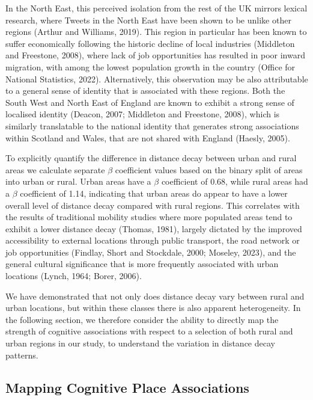 \documentclass[
  letterpaper,
  11pt,
  english,
  onehalfspacing,
  headsepline]{MastersDoctoralThesis}
\begin{document}
In the North East, this perceived isolation from the rest of the UK
mirrors lexical research, where Tweets in the North East have been shown
to be unlike other regions (Arthur and Williams, 2019). This region in
particular has been known to suffer economically following the historic
decline of local industries (Middleton and Freestone, 2008), where lack
of job opportunities has resulted in poor inward migration, with among
the lowest population growth in the country (Office for National
Statistics, 2022). Alternatively, this observation may be also
attributable to a general sense of identity that is associated with
these regions. Both the South West and North East of England are known
to exhibit a strong sense of localised identity (Deacon, 2007; Middleton
and Freestone, 2008), which is similarly translatable to the national
identity that generates strong associations within Scotland and Wales,
that are not shared with England (Haesly, 2005).

To explicitly quantify the difference in distance decay between urban
and rural areas we calculate separate \(\beta\) coefficient values based
on the binary split of areas into urban or rural. Urban areas have a
\(\beta\) coefficient of 0.68, while rural areas had a \(\beta\)
coefficient of 1.14, indicating that urban areas do appear to have a
lower overall level of distance decay compared with rural regions. This
correlates with the results of traditional mobility studies where more
populated areas tend to exhibit a lower distance decay (Thomas, 1981),
largely dictated by the improved accessibility to external locations
through public transport, the road network or job opportunities
(Findlay, Short and Stockdale, 2000; Moseley, 2023), and the general
cultural significance that is more frequently associated with urban
locations (Lynch, 1964; Borer, 2006).

We have demonstrated that not only does distance decay vary between
rural and urban locations, but within these classes there is also
apparent heterogeneity. In the following section, we therefore consider
the ability to directly map the strength of cognitive associations with
respect to a selection of both rural and urban regions in our study, to
understand the variation in distance decay patterns.

\hypertarget{mapping-cognitive-place-associations}{%
\subsection{Mapping Cognitive Place
Associations}\label{mapping-cognitive-place-associations}}
\end{document}
